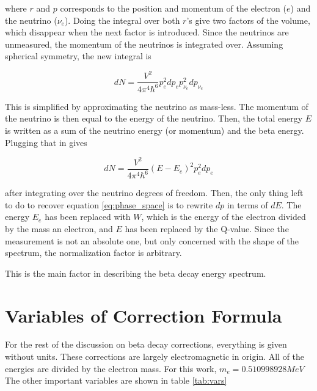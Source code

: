 \documentclass[../MaxHughesThesis.tex]{subfiles}
\begin{document}
where $r$ and $p$ corresponds to the position and momentum of the electron ($e$) and the neutrino ($\nu_{e}$).
Doing the integral over both $r$'s give two factors of the volume, which disappear when the next factor is introduced.
Since the neutrinos are unmeasured, the momentum of the neutrinos is integrated over. 
Assuming spherical symmetry, the new integral is %

\begin{equation}
	dN = \frac{V^{2}}{4\pi^{4}\hbar^{6}}p_{e}^{2}dp_{e}p_{\nu_{e}}^{2}dp_{\nu_{e}}
	\label{eq:dosspherical}
\end{equation}

This is simplified by approximating the neutrino as mass-less.
The momentum of the neutrino is then equal to the energy of the neutrino.
Then, the total energy $E$ is written as a sum of the neutrino energy (or momentum) and the beta energy.
Plugging that in gives %

\begin{equation}
	dN = \frac{V^{2}}{4\pi^{4}\hbar^{6}}(E - E_{e})^{2}p_{e}^{2}dp_{e}
	\label{eq:dosintegral}
\end{equation}

after integrating over the neutrino degrees of freedom. 
Then, the only thing left to do to recover equation \ref{eq:phase_space} is to rewrite $dp$ in terms of $dE$. 
The energy $E_{e}$ has been replaced with $W$, which is the energy of the electron divided by the mass an electron, and $E$ has been replaced by the Q-value.
Since the measurement is not an absolute one, but only concerned with the shape of the spectrum, the normalization factor is arbitrary.

This is the main factor in describing the beta decay energy spectrum.

\section{Variables of Correction Formula}

For the rest of the discussion on beta decay corrections, everything is given without units.
These corrections are largely electromagnetic in origin.
All of the energies are divided by the electron mass.
For this work, $m_{e} = 0.510998928 MeV$
The other important variables are shown in table \ref{tab:vars}
\end{document}
